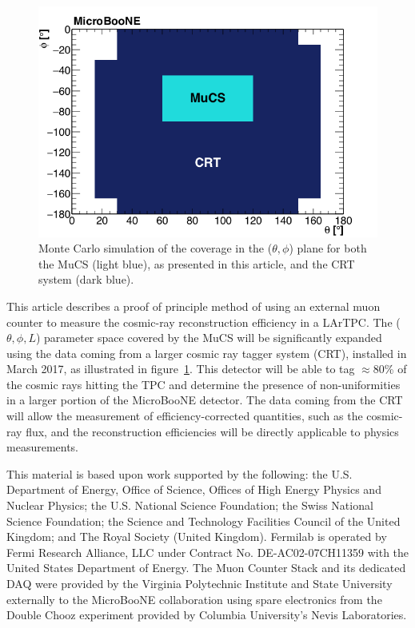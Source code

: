 \documentclass[a4paper,11pt]{article}
\begin{document}
\begin{figure}[htbp]
  \begin{center}
    \includegraphics[width=0.7\linewidth]{figures/crt.png}
    \caption{Monte Carlo simulation of the coverage in the ($\theta,\phi$) plane for both the MuCS (light blue), as presented in this article, and the CRT system (dark blue).} \label{fig:crt}
  \end{center}
\end{figure}

This article describes a proof of principle method of using an external muon counter to measure the cosmic-ray reconstruction efficiency in a LArTPC. The ($\theta, \phi, L$) parameter space covered by the MuCS will be significantly expanded using the data coming from a larger cosmic ray tagger system (CRT), installed in March 2017, as illustrated in figure~\ref{fig:crt}. This detector will be able to tag $\approx$80\% of the cosmic rays hitting the TPC and determine the presence of non-uniformities in a larger portion of the MicroBooNE detector. The data coming from the CRT will allow the measurement of efficiency-corrected quantities, such as the cosmic-ray flux, and the reconstruction efficiencies will be directly applicable to physics measurements.

\clearpage{}

\acknowledgments

This material is based upon work supported by the following: the U.S. Department of Energy, Office of Science, Offices of High Energy Physics and Nuclear Physics; the U.S. National Science Foundation; the Swiss National Science Foundation; the Science and Technology Facilities Council of the United Kingdom; and The Royal Society (United Kingdom). Fermilab is operated by Fermi Research Alliance, LLC under Contract No. DE-AC02-07CH11359 with the United States Department of Energy. The Muon Counter Stack and its dedicated DAQ were provided by the Virginia Polytechnic Institute and State University externally to the MicroBooNE collaboration using spare electronics from the Double Chooz experiment provided by Columbia University's Nevis Laboratories.
\end{document}
